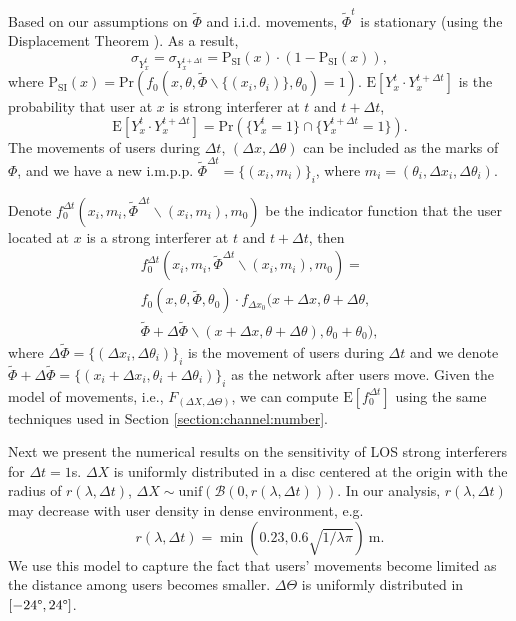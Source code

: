 \documentclass[10pt, conference, letterpaper]{IEEEtran}
\begin{document}
Based on our assumptions on $\tilde{\Phi}$ and i.i.d. movements, $\tilde{\Phi}^t$ is stationary (using the Displacement Theorem \cite{poisson}).
As a result, 
\begin{equation*}
\sigma_{Y_x^t} = \sigma_{Y_x^{t+\Delta t}}=\mathrm{P}_{\mathrm{SI}}(x)\cdot (1-\mathrm{P}_{\mathrm{SI}}(x)),
\end{equation*}
where $\mathrm{P}_{\mathrm{SI}}(x)=\mathrm{Pr}(f_0(x,\theta,\tilde{\Phi}\backslash\{(x_i,\theta_i)\}, \theta_0)=1)$. 
$\mathrm{E}[Y_x^t\cdot Y_x^{t + \Delta t}]$ is the probability that user at $x$ is strong interferer at $t$ and $t + \Delta t$,
\begin{equation*}
\mathrm{E}[Y_x^t\cdot Y_x^{t + \Delta t}] = \mathrm{Pr}(\{Y_x^t=1\}\cap \{Y_x^{t+\Delta t}=1\}).
\end{equation*}
The movements of users during $\Delta t$, $(\Delta x, \Delta \theta)$ can be included as the marks of $\Phi$, and we have a new i.m.p.p. $\tilde{\Phi}^{\Delta t} = \{(x_i, m_i)\}_i$, where $m_i = (\theta_i, \Delta x_i, \Delta \theta_i)$.

Denote $f_0^{\Delta  t}(x_i, m_i, \tilde{\Phi}^{\Delta t}\backslash (x_i, m_i), m_0)$ be the indicator function that the user located at $x$ is a strong interferer at $t$ and $t + \Delta t$, then 
\begin{multline*}
f_0^{\Delta  t}(x_i, m_i, \tilde{\Phi}^{\Delta t}\backslash (x_i, m_i), m_0) = \\
f_0(x,\theta, \tilde{\Phi}, \theta_0) 
\cdot f_{\Delta x_0}(x+\Delta x,\theta + \Delta \theta, 
\\ \tilde{\Phi} + \Delta \tilde{\Phi}\backslash (x+\Delta x,\theta + \Delta \theta), \theta_0+\theta_0),
\end{multline*}
where $\Delta \tilde{\Phi} = \{(\Delta x_i, \Delta \theta_i)\}_i$ is the movement of users during $\Delta t$ and we denote $\tilde{\Phi} + \Delta \tilde{\Phi} = \{(x_i+\Delta x_i, \theta_i + \Delta \theta_i)\}_i$ as the network after users move.  
Given the model of movements, i.e., $F_{(\Delta X, \Delta \Theta)}$, we can compute $\mathrm{E}[f_0^{\Delta t}]$ using the same techniques used in Section \ref{section:channel:number}. 

Next we present the numerical results on the sensitivity of LOS strong interferers for $\Delta t= 1$s.
$\Delta X$ is uniformly distributed in a disc centered at the origin with the radius of $r(\lambda, \Delta t)$, $\Delta X \sim \mathrm{unif}(\mathcal{B}(0, r(\lambda, \Delta t)))$. 
In our analysis, $r(\lambda, \Delta t)$ may decrease with user density in dense environment, e.g.
\begin{equation*}
r(\lambda,\Delta t) = \min(0.23, 0.6 \sqrt{1/\lambda\pi}) \mathrm{~m}.
\end{equation*}
We use this model to capture the fact that users' movements become limited as the distance among users becomes smaller. $\Delta \Theta$ is uniformly distributed in $[-24\degree, 24 \degree]$.
\end{document}
